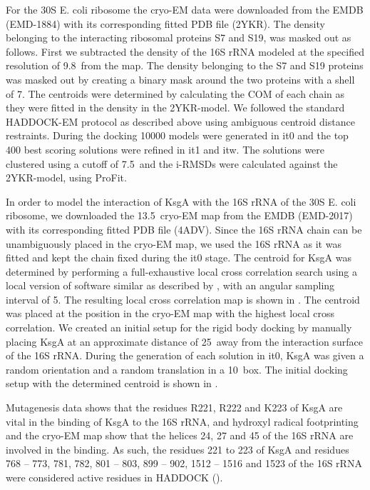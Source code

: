 
For the 30S E. coli ribosome the cryo-EM data were downloaded from the EMDB
(EMD-1884) with its corresponding fitted PDB file (2YKR).  The density
belonging to the interacting ribosomal proteins S7 and S19, was masked out as
follows.  First we subtracted the density of the 16S rRNA modeled at the
specified resolution of 9.8\Angstrom\ from the map.  The density belonging to
the S7 and S19 proteins was masked out by creating a binary mask around the two
proteins with a shell of 7\Angstrom.  The centroids were determined by
calculating the COM of each chain as they were fitted in the density in the
2YKR-model.  We followed the standard HADDOCK-EM protocol as described above
using ambiguous centroid distance restraints.  During the docking 10000 models
were generated in it0 and the top 400 best scoring solutions were refined in
it1 and itw.  The solutions were clustered using a cutoff of 7.5\Angstrom\ and
the i-RMSDs were calculated against the 2YKR-model, using ProFit.


In order to model the interaction of KsgA with the 16S rRNA of the 30S E. coli
ribosome, we downloaded the 13.5\Angstrom\ cryo-EM map from the EMDB (EMD-2017)
with its corresponding fitted PDB file (4ADV).  Since the 16S rRNA chain can be
unambiguously placed in the cryo-EM map, we used the 16S rRNA as it was fitted
and kept the chain fixed during the it0 stage.  The centroid for KsgA was
determined by performing a full-exhaustive local cross correlation search using
a local version of software similar as described by \citeauthor{Hoang2013},
with an angular sampling interval of 5\Deg. The resulting local cross
correlation map is shown in .  The centroid was
placed at the position in the cryo-EM map with the highest local cross
correlation.  We created an initial setup for the rigid body docking by
manually placing KsgA at an approximate distance of 25\Angstrom\ away from the
interaction surface of the 16S rRNA.  During the generation of each solution in
it0, KsgA was given a random orientation and a random translation in a
10\Angstrom\ box.  The initial docking setup with the determined centroid is
shown in .

Mutagenesis data shows that the residues R221, R222 and K223 of KsgA are vital
in the binding of KsgA to the 16S rRNA, and hydroxyl radical footprinting and
the cryo-EM map show that the helices 24, 27 and 45 of the 16S rRNA are
involved in the binding.  As such, the residues 221 to 223 of KsgA and residues
768 – 773, 781, 782, 801 – 803, 899 – 902, 1512 – 1516 and 1523 of the 16S rRNA
were considered active residues in HADDOCK
().

